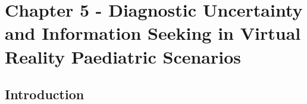 \documentclass[a4paper, nobind]{templates/ociamthesis}
\begin{document}
\begin{romanpages}







\dominitoc %

\flushbottom




\end{romanpages}

\flushbottom

\chapter{Chapter 5 - Diagnostic Uncertainty and Information Seeking in Virtual Reality Paediatric Scenarios}\label{chapter-5}

\adjustmtc
{}

\section{Introduction}\label{introduction}
\end{document}
